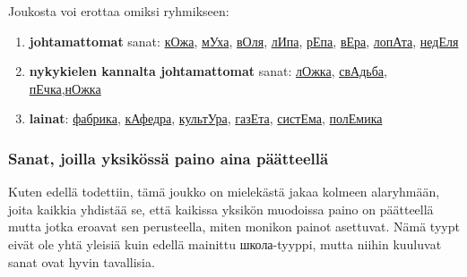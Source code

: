 \documentclass[]{scrreprt}
\providecommand{\tightlist}{%
  \setlength{\itemsep}{0pt}\setlength{\parskip}{0pt}}
\begin{document}
Joukosta voi erottaa omiksi ryhmikseen:

\begin{enumerate}
\def\labelenumi{\arabic{enumi}.}
\tightlist
\item
  \textbf{johtamattomat} sanat:
  \href{http://ru.wiktionary.org/wiki/\%D0\%BA\%D0\%BE\%D0\%B6\%D0\%B0}{кОжа},
  \href{http://ru.wiktionary.org/wiki/\%D0\%BC\%D1\%83\%D1\%85\%D0\%B0}{мУха},
  \href{http://ru.wiktionary.org/wiki/\%D0\%B2\%D0\%BE\%D0\%BB\%D1\%8F}{вОля},
  \href{http://ru.wiktionary.org/wiki/\%D0\%BB\%D0\%B8\%D0\%BF\%D0\%B0}{лИпа},
  \href{http://ru.wiktionary.org/wiki/\%D1\%80\%D0\%B5\%D0\%BF\%D0\%B0}{рЕпа},
  \href{http://ru.wiktionary.org/wiki/\%D0\%B2\%D0\%B5\%D1\%80\%D0\%B0}{вЕра},
  \href{http://ru.wiktionary.org/wiki/\%D0\%BB\%D0\%BE\%D0\%BF\%D0\%B0\%D1\%82\%D0\%B0}{лопАта},
  \href{http://ru.wiktionary.org/wiki/\%D0\%BD\%D0\%B5\%D0\%B4\%D0\%B5\%D0\%BB\%D1\%8F}{недЕля}
\item
  \textbf{nykykielen kannalta johtamattomat} sanat:
  \href{http://ru.wiktionary.org/wiki/\%D0\%BB\%D0\%BE\%D0\%B6\%D0\%BA\%D0\%B0}{лОжка},
  \href{http://ru.wiktionary.org/wiki/\%D1\%81\%D0\%B2\%D0\%B0\%D0\%B4\%D1\%8C\%D0\%B1\%D0\%B0}{свАдьба},
  \href{http://ru.wiktionary.org/wiki/\%D0\%BF\%D0\%B5\%D1\%87\%D0\%BA\%D0\%B0}{пЕчка},\href{http://ru.wiktionary.org/wiki/\%D0\%BD\%D0\%BE\%D0\%B6\%D0\%BA\%D0\%B0}{нОжка}
\item
  \textbf{lainat}:
  \href{http://ru.wiktionary.org/wiki/\%D1\%84\%D0\%B0\%D0\%B1\%D1\%80\%D0\%B8\%D0\%BA\%D0\%B0}{фабрика},
  \href{http://ru.wiktionary.org/wiki/\%D0\%BA\%D0\%B0\%D1\%84\%D0\%B5\%D0\%B4\%D1\%80\%D0\%B0}{кАфедра},
  \href{http://ru.wiktionary.org/wiki/\%D0\%BA\%D1\%83\%D0\%BB\%D1\%8C\%D1\%82\%D1\%83\%D1\%80\%D0\%B0}{культУра},
  \href{http://ru.wiktionary.org/wiki/\%D0\%B3\%D0\%B0\%D0\%B7\%D0\%B5\%D1\%82\%D0\%B0}{газЕта},
  \href{http://ru.wiktionary.org/wiki/\%D1\%81\%D0\%B8\%D1\%81\%D1\%82\%D0\%B5\%D0\%BC\%D0\%B0}{систЕма},
  \href{http://ru.wiktionary.org/wiki/\%D0\%BF\%D0\%BE\%D0\%BB\%D0\%B5\%D0\%BC\%D0\%B8\%D0\%BA\%D0\%B0}{полЕмика}
\end{enumerate}

\subsubsection{Sanat, joilla yksikössä paino aina
päätteellä}\label{sanat-joilla-yksikuxf6ssuxe4-paino-aina-puxe4uxe4tteelluxe4}

Kuten edellä todettiin, tämä joukko on mielekästä jakaa kolmeen
alaryhmään, joita kaikkia yhdistää se, että kaikissa yksikön muodoissa
paino on päätteellä mutta jotka eroavat sen perusteella, miten monikon
painot asettuvat. Nämä tyypt eivät ole yhtä yleisiä kuin edellä mainittu
школа-tyyppi, mutta niihin kuuluvat sanat ovat hyvin tavallisia.
\end{document}
